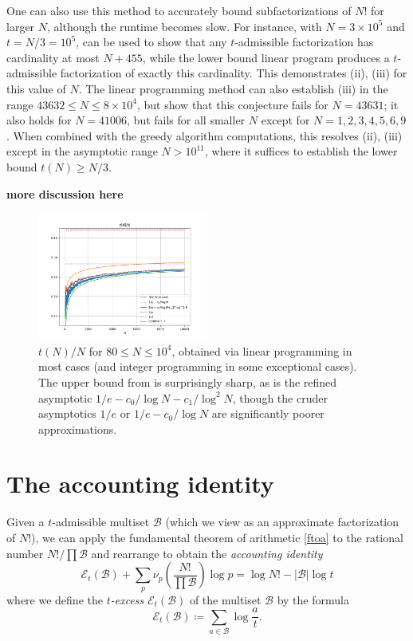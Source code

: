 \documentclass[12pt,a4paper,reqno]{amsart}
\numberwithin{equation}{section}
\theoremstyle{plain}
\theoremstyle{definition}
\newcommand\tuple{{\mathcal B}}
\newcommand\excess{{\mathcal{E}}}
\begin{document}
One can also use this method to accurately bound subfactorizations of $N!$ for larger $N$, although the runtime becomes slow.  For instance, with $N = 3 \times 10^5$ and $t = N/3 = 10^5$,  can be used to show that any $t$-admissible factorization has cardinality at most $N+455$, while the lower bound linear program produces a $t$-admissible factorization of exactly this cardinality.  This demonstrates (ii), (iii) for this value of $N$.  The linear programming method can also establish (iii) in the range $43632 \leq N \leq 8 \times 10^4$, but show that this conjecture fails for $N = 43631$; it also holds for $N=41006$, but fails for all smaller $N$ except for $N=1,2,3,4,5,6,9$.  When combined with the greedy algorithm computations, this resolves (ii), (iii) except in the asymptotic range $N > 10^{11}$, where it suffices to establish the lower bound $t(N) \geq N/3$.

{\bf more discussion here}


\begin{figure}
  \centering
  \includegraphics[width=0.5\textwidth]{longplot.png}
  \caption{$t(N)/N$ for $80 \leq N \leq 10^4$, obtained via linear programming in most cases (and integer programming in some exceptional cases).  The upper bound from  is surprisingly sharp, as is the refined asymptotic $1/e - c_0/\log N - c_1/\log^2 N$, though the cruder asymptotics $1/e$ or $1/e - c_0/\log N$ are significantly poorer approximations.}
  \label{fig-long}
  \end{figure}

\section{The accounting identity}\label{accounting-sec}

Given a $t$-admissible multiset $\tuple$ (which we view as an approximate factorization of $N!$), we can apply the fundamental theorem of arithmetic \eqref{ftoa} to the rational number  $N!/\prod \tuple$ and rearrange to obtain the \emph{accounting identity}
\begin{equation}\label{accounting} 
  \excess_t(\tuple) + \sum_p \nu_p\left( \frac{N!}{\prod \tuple} \right) \log p = \log N! - |\tuple| \log t
\end{equation}
where we define the \emph{$t$-excess} $\excess_t(\tuple)$ of the multiset $\tuple$ by the formula
\begin{equation}\label{excess-def}
  \excess_t(\tuple) \coloneqq \sum_{a \in \tuple} \log \frac{a}{t}.
\end{equation}
\end{document}
